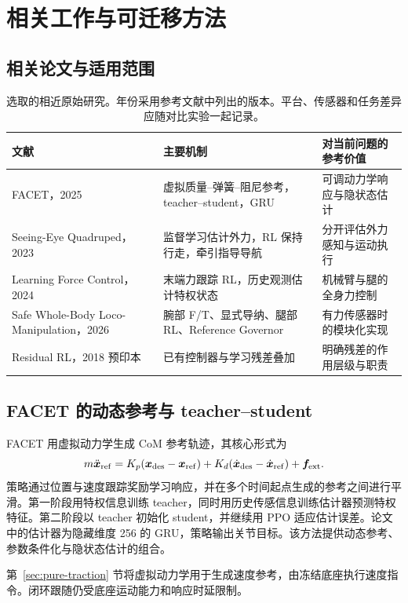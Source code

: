 \section{相关工作与可迁移方法}
\subsection{相关论文与适用范围}
\begin{table}[htbp]\centering\small
\begin{tabularx}{\linewidth}{P{32mm}Y Y}
\toprule 文献 & 主要机制 & 对当前问题的参考价值\\\midrule
FACET，2025\cite{facet2025} & 虚拟质量--弹簧--阻尼参考，teacher--student，GRU & 可调动力学响应与隐状态估计\\
Seeing-Eye Quadruped，2023\cite{defazio2023} & 监督学习估计外力，RL 保持行走，牵引指导导航 & 分开评估外力感知与运动执行\\
Learning Force Control，2024\cite{portela2024} & 末端力跟踪 RL，历史观测估计特权状态 & 机械臂与腿的全身力控制\\
Safe Whole-Body Loco-Manipulation，2026\cite{schperberg2026} & 腕部 F/T、显式导纳、腿部 RL、Reference Governor & 有力传感器时的模块化实现\\
Residual RL，2018 预印本\cite{johannink2018} & 已有控制器与学习残差叠加 & 明确残差的作用层级与职责\\\bottomrule
\end{tabularx}
\caption{选取的相近原始研究。年份采用参考文献中列出的版本。平台、传感器和任务差异应随对比实验一起记录。}
\end{table}

\subsection{FACET 的动态参考与 teacher--student}
FACET 用虚拟动力学生成 CoM 参考轨迹，其核心形式为
\begin{equation}
 m\ddot{\bm x}_{\rm ref}=K_p(\bm x_{\rm des}-\bm x_{\rm ref})
 +K_d(\dot{\bm x}_{\rm des}-\dot{\bm x}_{\rm ref})+\bm f_{\rm ext}.
\end{equation}
策略通过位置与速度跟踪奖励学习响应，并在多个时间起点生成的参考之间进行平滑。第一阶段用特权信息训练 teacher，同时用历史传感信息训练估计器预测特权特征。第二阶段以 teacher 初始化 student，并继续用 PPO 适应估计误差。论文中的估计器为隐藏维度 256 的 GRU，策略输出关节目标。该方法提供动态参考、参数条件化与隐状态估计的组合。\cite{facet2025}

第~\ref{sec:pure-traction} 节将虚拟动力学用于生成速度参考，由冻结底座执行速度指令。闭环跟随仍受底座运动能力和响应时延限制。

